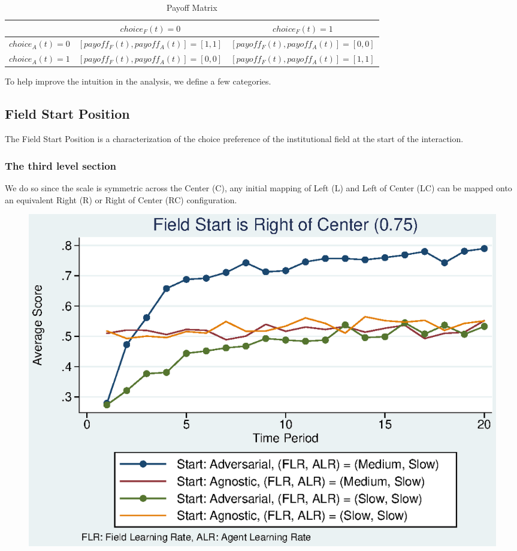 \documentclass[12pt,letterpaper]{article}
\begin{document}
\begin{table}
\begin{centering}
\caption {Payoff Matrix}
\label{payoffmatrix}
{\tabulinesep=1.4mm
\begin{tabu}{|c|c|c|}
\hline
&$choice_F(t) = 0$&$choice_F(t) = 1$\\\hline
$choice_A(t) = 0$&$[payoff_F(t),payoff_A(t)]=[1,1]$&$[payoff_F(t),payoff_A(t)]=[0,0]$\\\hline
$choice_A(t) = 1$&$[payoff_F(t),payoff_A(t)]=[0,0]$&$[payoff_F(t),payoff_A(t)]=[1,1]$\\\hline
\end{tabu}}

\end{centering}
\end{table} 

To help improve the intuition in the analysis, we define a few categories. 

\subsection{Field Start Position}
The Field Start Position is a characterization of the choice preference of the institutional field at the start of the interaction. 
\subsubsection{The third level section}
We do so since the scale is symmetric across the Center (C), any initial mapping of Left (L) and Left of Center (LC) can be mapped onto an equivalent Right (R) or Right of Center (RC) configuration. 

\begin{figure}[h]
\begin{centering}
  \caption{}
  \includegraphics[width=\textwidth]{frcmedium3a}
  \label{fig:3a}
\end{centering}
\end{figure}
\end{document}

